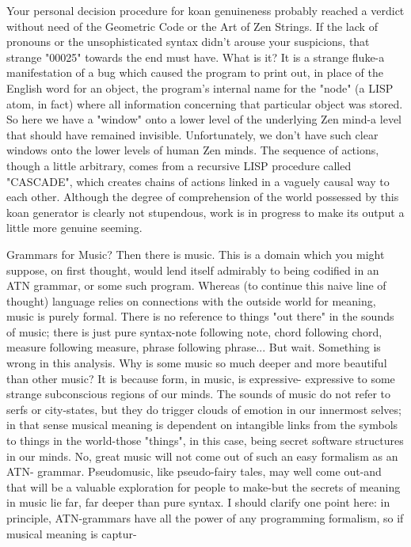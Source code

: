 {        Your personal decision procedure for koan genuineness probably reached a
verdict without need of the Geometric Code or the Art of Zen Strings. If the lack of
pronouns or the unsophisticated syntax didn't arouse your suspicions, that strange
"00025" towards the end must have. What is it? It is a strange fluke-a manifestation of a
bug which caused the program to print out, in place of the English word for an object, the
program's internal name for the "node" (a LISP atom, in fact) where all information
concerning that particular object was stored. So here we have a "window" onto a lower
level of the underlying Zen mind-a level that should have remained invisible.
Unfortunately, we don't have such clear windows onto the lower levels of human Zen
minds.
        The sequence of actions, though a little arbitrary, comes from a recursive LISP
procedure called "CASCADE", which creates chains of actions linked in a vaguely
causal way to each other. Although the degree of comprehension of the world possessed
by this koan generator is clearly not stupendous, work is in progress to make its output a
little more genuine seeming.

                                Grammars for Music?
Then there is music. This is a domain which you might suppose, on first thought, would
lend itself admirably to being codified in an ATN grammar, or some such program.
Whereas (to continue this naive line of thought) language relies on connections with the
outside world for meaning, music is purely formal. There is no reference to things "out
there" in the sounds of music; there is just pure syntax-note following note, chord
following chord, measure following measure, phrase following phrase...
        But wait. Something is wrong in this analysis. Why is some music so much
deeper and more beautiful than other music? It is because form, in music, is expressive-
expressive to some strange subconscious regions of our minds. The sounds of music do
not refer to serfs or city-states, but they do trigger clouds of emotion in our innermost
selves; in that sense musical meaning is dependent on intangible links from the symbols
to things in the world-those "things", in this case, being secret software structures in our
minds. No, great music will not come out of such an easy formalism as an ATN-
grammar. Pseudomusic, like pseudo-fairy tales, may well come out-and that will be a
valuable exploration for people to make-but the secrets of meaning in music lie far, far
deeper than pure syntax.
        I should clarify one point here: in principle, ATN-grammars have all the power of
any programming formalism, so if musical meaning is captur-




}
